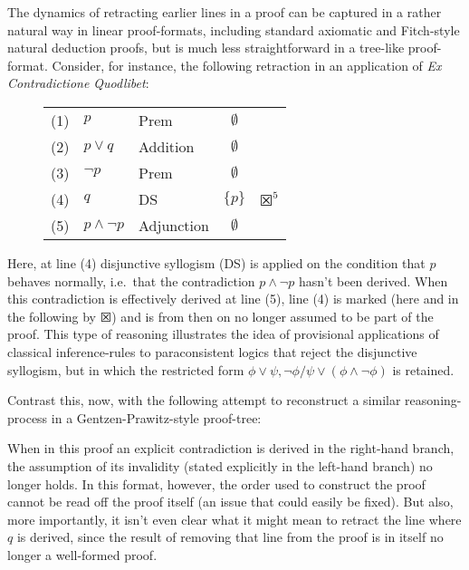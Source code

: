 \documentclass[]{article}
\begin{document}
The dynamics of retracting earlier lines in a proof can be captured in a rather natural way in linear proof-formats, including standard axiomatic and Fitch-style natural deduction proofs, but is much less straightforward in a tree-like proof-format. Consider, for instance, the following retraction in an application of \emph{Ex Contradictione Quodlibet}:

\begin{figure}[h!]
\centering
    \begin{tabular}{cllcl}
        (1) & $p$ & Prem & $\emptyset$\\
        (2) & $p \vee q$ & Addition & $\emptyset$\\
        (3) & $\neg p$ & Prem & $\emptyset$\\
        (4) & $q$ & DS & $\{p\}$ & $\XBox^5$\\
        (5) & $p \wedge \neg p$ & Adjunction & $\emptyset$
    \end{tabular}
\end{figure}
\noindent Here, at line (4) disjunctive syllogism (DS) is applied on the condition that $p$ behaves normally, i.e.\ that the contradiction $p \wedge \neg p$ hasn't been derived. When this contradiction is effectively derived at line (5), line (4) is marked (here and in the following by $\XBox$) and is from then on no longer assumed to be part of the proof. This type of reasoning illustrates the idea of provisional applications of classical inference-rules to paraconsistent logics that reject the disjunctive syllogism, but in which the restricted form $\phi \vee \psi, \neg \phi / \psi \vee (\phi \wedge \neg \phi)$ is retained.

Contrast this, now, with the following attempt to reconstruct a similar reasoning-process in a Gentzen-Prawitz-style proof-tree:

\begin{prooftree}
\end{prooftree}
When in this proof an explicit contradiction is derived in the right-hand branch, the assumption of its invalidity (stated explicitly in the left-hand branch) no longer holds. In this format, however, the order used to construct the proof cannot be read off the proof itself (an issue that could easily be fixed). But also, more importantly, it isn't even clear what it might mean to retract the line where $q$ is derived, since the result of removing that line from the proof is in itself no longer a well-formed proof.
\end{document}
